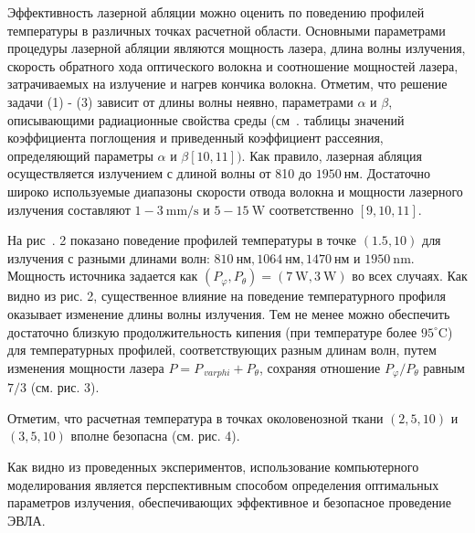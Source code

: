 Эффективность лазерной абляции можно оценить по поведению профилей
температуры в различных точках расчетной области.
Основными параметрами процедуры лазерной абляции являются мощность лазера, длина волны излучения,
скорость обратного хода оптического волокна и соотношение мощностей лазера,
затрачиваемых на излучение и нагрев кончика волокна.
Отметим, что решение задачи (1) - (3) зависит от длины волны неявно,
параметрами $\alpha$ и $\beta$, описывающими радиационные свойства среды
(см~. таблицы значений коэффициента поглощения и приведенный коэффициент рассеяния,
определяющий параметры $\alpha$ и $\beta[10,11])$.
Как правило, лазерная абляция осуществляется излучением с длиной волны от 810 до $1950 \mathrm{~нм}$.
Достаточно широко используемые диапазоны скорости отвода волокна и
мощности лазерного излучения составляют
$1-3 \mathrm{~mm}/\mathrm{s}$ и $5-15 \mathrm{~W}$ соответственно $[9, 10,11]$.

На рис~. 2 показано поведение профилей температуры в точке $(1.5,10)$
для излучения с разными длинами волн: $810 \mathrm{~нм}, 1064 \mathrm{~нм}, 1470 \mathrm{~нм}$
и $1950 \mathrm{~nm}$.
Мощность источника задается как
$\left(P_{\varphi}, P_{\theta}\right)=(7 \mathrm{~W}, 3 \mathrm{~W})$ во всех случаях.
Как видно из рис. 2, существенное влияние на поведение температурного профиля
оказывает изменение длины волны излучения.
Тем не менее можно обеспечить достаточно близкую продолжительность кипения
(при температуре более $95^{\circ}\mathrm{C}$)
для температурных профилей, соответствующих разным длинам волн, путем изменения
мощности лазера $P=P_{\ varphi}+P_{\theta}$,
сохраняя отношение $P_{\varphi}/P_{\theta}$ равным $7/3$ (см. рис. 3).

Отметим, что расчетная температура в точках околовенозной ткани
$(2,5,10)$ и $(3,5,10)$ вполне безопасна (см. рис. 4).

Как видно из проведенных экспериментов, использование компьютерного моделирования
является перспективным способом определения оптимальных параметров излучения,
обеспечивающих эффективное и безопасное проведение ЭВЛА.

